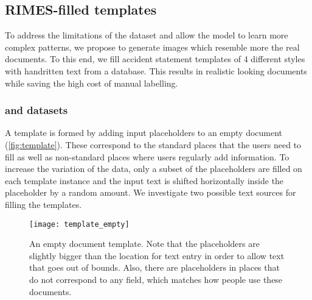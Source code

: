 
	\subsection{RIMES-filled templates}

			To address the limitations of the  dataset and allow the model to learn more complex patterns, we propose to generate images which resemble more the real documents. To this end, we fill accident statement templates of 4 different styles with handritten text from a database. This results in realistic looking documents while saving the high cost of manual labelling.


		\subsubsection*{ and  datasets}\label{sec:rimes_template}
			A template is formed by adding input placeholders to an empty document (\autoref{fig:template}). These correspond to the standard places that the users need to fill as well as non-standard places where users regularly add information. To increase the variation of the data, only a subset of the placeholders are filled on each template instance and the input text is shifted horizontally inside the placeholder by a random amount. We investigate two possible text sources for filling the templates.

			\begin{figure}
				\texttt{[image: template\_empty]}
				\caption[Document template]{An empty document template. Note that the placeholders are slightly bigger than the location for text entry in order to allow text that goes out of bounds. Also, there are placeholders in places that do not correspond to any field, which matches how people use these documents.}
				\label{fig:template}
			\end{figure}


